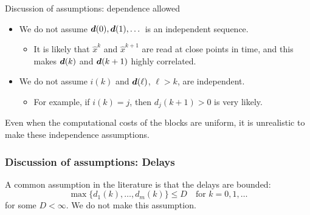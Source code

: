 \documentclass[10pt,mathserif]{beamer}
\begin{document}
\begin{frame}{Discussion of assumptions: dependence allowed}
    \begin{itemize}
        \item 
        We do not assume $\boldsymbol{d}(0),\boldsymbol{d}(1),\dots$ is an independent sequence.
        \begin{itemize}
            \item 
            It is likely that $\hat{x}^k$ and $\hat{x}^{k+1}$ are read at close points in time, and this makes $\boldsymbol{d}(k)$ and $\boldsymbol{d}(k+1)$ highly correlated.
        \end{itemize}
        \item 
        We do not assume $i(k)$ and $\boldsymbol{d}(\ell)$, $\ell>k$, are independent.
        \begin{itemize}
            \item 
            For example, if $i(k)=j$, then $d_j(k+1)>0$ is very likely.
        \end{itemize}
    \end{itemize}

    Even when the computational costs of the blocks are uniform, it is unrealistic to make these independence assumptions.
\end{frame}



\begin{frame}
\frametitle{Discussion of assumptions: Delays}
A common assumption in the literature is that the delays are bounded:
$$\max\{d_1(k),\dots,d_m(k)\}\le D\quad\text{for }k=0,1,\dots$$ for some $D<\infty$.
We do not make this assumption.

\end{frame}
\end{document}
